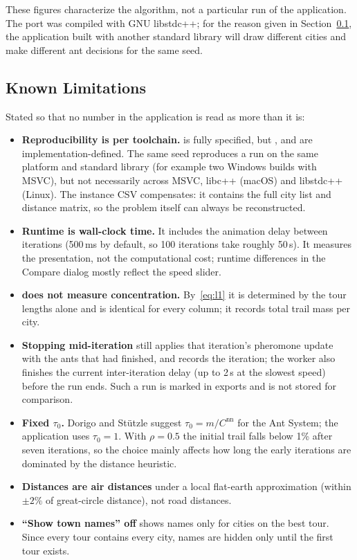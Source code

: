 \documentclass[11pt,a4paper]{article}
\begin{document}
These figures characterize the algorithm, not a particular run of the application. The port was compiled
with GNU libstdc++; for the reason given in Section~\ref{sec:limits}, the application built with another
standard library will draw different cities and make different ant decisions for the same seed.

\subsection{Known Limitations}\label{sec:limits}
Stated so that no number in the application is read as more than it is:
\begin{itemize}
  \item \textbf{Reproducibility is per toolchain.}  is fully specified, but
        ,  and  are
        implementation-defined. The same seed reproduces a run on the same platform and standard library
        (for example two Windows builds with MSVC), but not necessarily across MSVC, libc++ (macOS) and
        libstdc++ (Linux). The instance CSV compensates: it contains the full city list and distance matrix,
        so the problem itself can always be reconstructed.
  \item \textbf{Runtime is wall-clock time.} It includes the animation delay between iterations (500\,ms by
        default, so 100 iterations take roughly 50\,s). It measures the presentation, not the computational
        cost; runtime differences in the Compare dialog mostly reflect the speed slider.
  \item \textbf{ does not measure concentration.} By~\eqref{eq:l1} it is determined by the tour
        lengths alone and is identical for every column; it records total trail mass per city.
  \item \textbf{Stopping mid-iteration} still applies that iteration's pheromone update with the ants that had
        finished, and records the iteration; the worker also finishes the current inter-iteration delay
        (up to 2\,s at the slowest speed) before the run ends. Such a run is marked  in exports and is not
        stored for comparison.
  \item \textbf{Fixed $\tau_0$.} Dorigo and Stützle suggest $\tau_0=m/C^{\text{nn}}$ for the Ant System; the
        application uses $\tau_0=1$. With $\rho=0.5$ the initial trail falls below 1\% after seven iterations, so
        the choice mainly affects how long the early iterations are dominated by the distance heuristic.
  \item \textbf{Distances are air distances} under a local flat-earth approximation (within $\pm2\%$ of
        great-circle distance), not road distances.
  \item \textbf{``Show town names'' off} shows names only for cities on the best tour. Since every tour contains
        every city, names are hidden only until the first tour exists.
\end{itemize}
\end{document}
